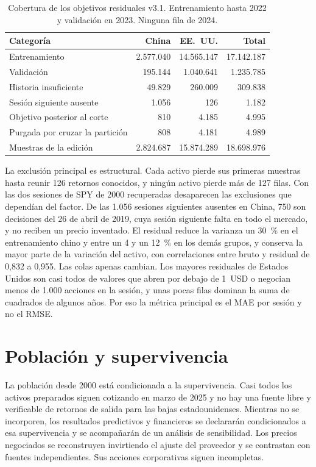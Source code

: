 \documentclass[11pt,a4paper]{report}
\begin{document}
\begin{table}[htbp]
\centering
\small
\caption{Cobertura de los objetivos residuales v3.1. Entrenamiento hasta 2022 y
validación en 2023. Ninguna fila de 2024.}
\label{tab:objetivos-v31}
\begin{tabular}{lrrr}
\toprule
Categoría & China & EE.~UU. & Total \\
\midrule
Entrenamiento & 2.577.040 & 14.565.147 & 17.142.187 \\
Validación & 195.144 & 1.040.641 & 1.235.785 \\
Historia insuficiente & 49.829 & 260.009 & 309.838 \\
Sesión siguiente ausente & 1.056 & 126 & 1.182 \\
Objetivo posterior al corte & 810 & 4.185 & 4.995 \\
Purgada por cruzar la partición & 808 & 4.181 & 4.989 \\
\midrule
Muestras de la edición & 2.824.687 & 15.874.289 & 18.698.976 \\
\bottomrule
\end{tabular}
\end{table}

La exclusión principal es estructural. Cada activo pierde sus primeras
muestras hasta reunir 126 retornos conocidos, y ningún activo pierde más de
127 filas. Con las dos sesiones de SPY de 2000 recuperadas desaparecen las
exclusiones que dependían del factor. De las 1.056 sesiones siguientes
ausentes en China, 750 son decisiones del 26 de abril de 2019, cuya sesión
siguiente falta en todo el mercado, y no reciben un precio inventado. El
residual reduce la varianza un 30~\% en el entrenamiento chino y entre un 4 y
un 12~\% en los demás grupos, y conserva la mayor parte de la variación del
activo, con correlaciones entre bruto y residual de 0,832 a 0,955. Las colas
apenas cambian. Los mayores residuales de Estados Unidos son casi todos de
valores que abren por debajo de 1~USD o negocian menos de 1.000 acciones en la
sesión, y unas pocas filas dominan la suma de cuadrados de algunos años. Por eso la métrica principal es el MAE por
sesión y no el RMSE.

\section{Población y supervivencia}
La población desde 2000 está condicionada a la supervivencia. Casi todos los
activos preparados siguen cotizando en marzo de 2025 y no hay una fuente libre
y verificable de retornos de salida para las bajas estadounidenses. Mientras
no se incorporen, los resultados predictivos y financieros se declararán
condicionados a esa supervivencia y se acompañarán de un análisis de
sensibilidad. Los precios negociados se reconstruyen invirtiendo el ajuste del
proveedor y se contrastan con fuentes independientes. Sus acciones
corporativas siguen incompletas.
\end{document}
